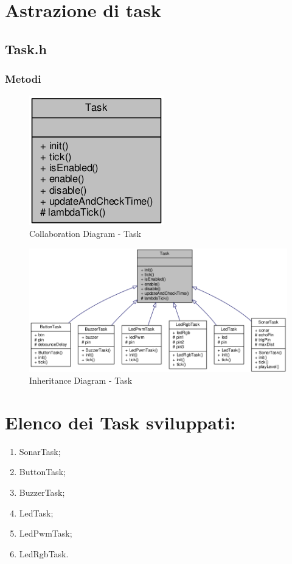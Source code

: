 \section{Astrazione di task}
\subsection{Task.h}
\subsubsection{Metodi}
\begin{figure}[!ht]
	\centering
	\includegraphics[scale=.5]{img/UML/CollaborationDiagram/Task.png}
	\caption{Collaboration Diagram - Task}
\end{figure}
\begin{figure}[!ht]
	\centering
	\includegraphics[scale=.45]{img/UML/InheritanceDiagram/Task.png}
	\caption{Inheritance Diagram - Task}
\end{figure}

\clearpage
\section{Elenco dei Task sviluppati:}
\begin{enumerate}
	\item SonarTask;
	\item ButtonTask;
	\item BuzzerTask;
	\item LedTask;
	\item LedPwmTask;
	\item LedRgbTask.
\end{enumerate}

